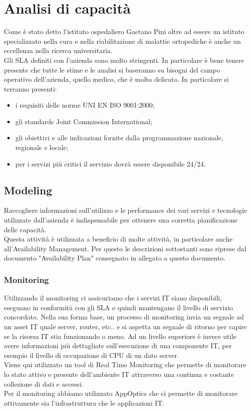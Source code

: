 \newpage
\section{Analisi di capacità} \label{ref:capacita}
Come è stato detto l'istituto ospedaliero Gaetano Pini oltre ad essere un istituto specializzato nella cura e nella riabilitazione di malattie ortopediche è anche un eccellenza nella ricerca universitaria. \\
Gli SLA definiti con l'azienda sono molto stringenti. In particolare è bene tenere presente che tutte le stime e le analisi si baseranno su bisogni del campo operativo dell'azienda, quello medico, che è molto delicato. In particolare si terranno presenti:
\begin{itemize}
	\item i requisiti delle norme UNI EN ISO 9001:2000;
	\item gli standards Joint Commission International;
	\item gli obiettivi e alle indicazioni fornite dalla programmazione nazionale, regionale e locale;
	\item per i servizi più critici il servizio dovrà essere disponibile 24/24.
\end{itemize}

\subsection{Modeling}
	Raccogliere informazioni sull'utilizzo e le performance dei vari servizi e tecnologie utilizzate dall'azienda è indispensabile per  ottenere una corretta pianificazione delle capacità. \\
	Questa attività è utilizzata a beneficio di molte attività, in particolare anche all'Availability Management. Per questo le descrizioni sottostanti sono riprese dal documento "Availability Plan" consegnato in allegato a questo documento.
	\subsubsection{Monitoring}
Utilizzando il monitoring ci assicuriamo che i servizi IT siano disponibili, eseguano in conformità con gli SLA e quindi mantengano il livello di servizio concordato. Nella sua forma base, un processo di monitoring invia un segnale ad un asset IT quale server, router, etc.. e si aspetta un segnale di ritorno per capire se la risorsa IT stia funzionando o meno.
Ad un livello superiore è invece utile avere informazioni più dettagliate sull'esecuzione di una componente IT, per esempio il livello di occupazione di CPU di un dato server.\\
Viene qui utilizzato un tool di Real Time Monitoring che permette di monitorare lo stato attivo e presente dell'ambiente IT attraverso una continua e costante collezione di dati e accessi. \\
Per il monitoring abbiamo utilizzato AppOptics che ci permette di monitorare attivamente sia l'infrastruttura che le applicazioni IT.
